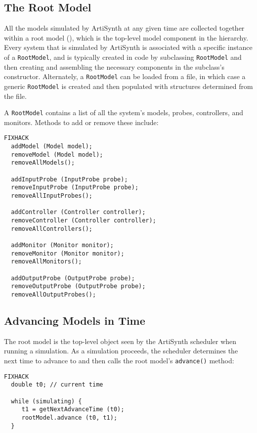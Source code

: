 \documentclass{article}
\begin{document}
\subsection{The Root Model}
\label{RootModelSec}

All the models simulated by ArtiSynth at any given time are collected
together within a root model (), which is the
top-level model component in the hierarchy. Every system that is
simulated by ArtiSynth is associated with a specific instance of a
{\tt RootModel}, and is typically created in code by subclassing
{\tt RootModel} and then creating and assembling the necessary components
in the subclass's constructor. Alternately, a {\tt RootModel} can be
loaded from a file, in which case a generic {\tt RootModel} is created and
then populated with structures determined from the file.

A {\tt RootModel} contains a list of all the system's models, probes,
controllers, and monitors. Methods to add or remove these include:

\begin{lstlisting}FIXHACK
  addModel (Model model);
  removeModel (Model model);
  removeAllModels();

  addInputProbe (InputProbe probe);
  removeInputProbe (InputProbe probe);
  removeAllInputProbes();

  addController (Controller controller);
  removeController (Controller controller);
  removeAllControllers();

  addMonitor (Monitor monitor);
  removeMonitor (Monitor monitor);
  removeAllMonitors();

  addOutputProbe (OutputProbe probe);
  removeOutputProbe (OutputProbe probe);
  removeAllOutputProbes();
\end{lstlisting}

\subsection{Advancing Models in Time}

The root model is the top-level object seen by the ArtiSynth scheduler
when running a simulation. As a simulation proceeds, the scheduler determines
the next time to advance to and then calls the root model's {\tt advance()}
method:
\begin{lstlisting}FIXHACK
  double t0; // current time

  while (simulating) {
     t1 = getNextAdvanceTime (t0);
     rootModel.advance (t0, t1);
  }
\end{lstlisting}
\end{document}
